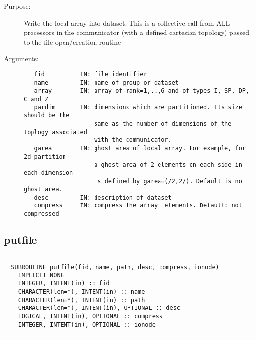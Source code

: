 \documentclass[a4paper]{article}
\begin{document}
\begin{description}
\item[Purpose:] \mbox{}

Write the local array into dataset.  This is a collective call from ALL
processors in the communicator (with a defined cartesian
topology) passed to the file open/creation routine

\item[Arguments:] \mbox{}

\begin{verbatim}
   fid          IN: file identifier
   name         IN: name of group or dataset
   array        IN: array of rank=1,..,6 and of types I, SP, DP, C and Z
   pardim       IN: dimensions which are partitioned. Its size should be the
                    same as the number of dimensions of the toplogy associated
                    with the communicator.
   garea        IN: ghost area of local array. For example, for 2d partition
                    a ghost area of 2 elements on each side in each dimension
                    is defined by garea=(/2,2/). Default is no ghost area.
   desc         IN: description of dataset
   compress     IN: compress the array  elements. Default: not compressed

\end{verbatim}


\end{description}





\subsection{putfile}

\par
\addvspace{\medskipamount}
\nopagebreak\hrule
\begin{verbatim}
  SUBROUTINE putfile(fid, name, path, desc, compress, ionode)
    IMPLICIT NONE
    INTEGER, INTENT(in) :: fid
    CHARACTER(len=*), INTENT(in) :: name
    CHARACTER(len=*), INTENT(in) :: path
    CHARACTER(len=*), INTENT(in), OPTIONAL :: desc
    LOGICAL, INTENT(in), OPTIONAL :: compress
    INTEGER, INTENT(in), OPTIONAL :: ionode
\end{verbatim}
\nopagebreak\hrule
\addvspace{\medskipamount}
\end{document}
